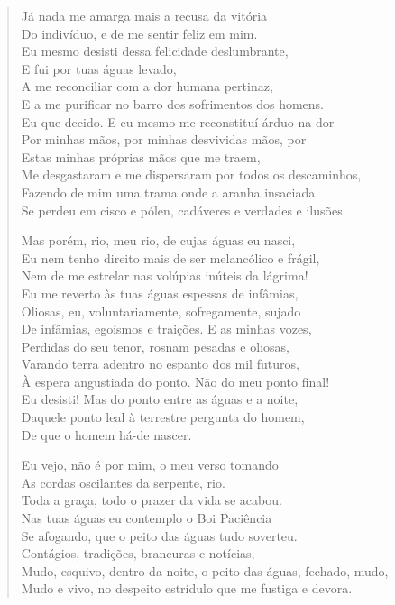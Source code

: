 \begin{verse}
Já nada me amarga mais a recusa da vitória\\
Do indivíduo, e de me sentir feliz em mim.\\
Eu mesmo desisti dessa felicidade deslumbrante,\\
E fui por tuas águas levado,\\
A me reconciliar com a dor humana pertinaz,\\
E a me purificar no barro dos sofrimentos dos homens.\\
Eu que decido. E eu mesmo me reconstituí árduo na dor\\
Por minhas mãos, por minhas desvividas mãos, por\\
Estas minhas próprias mãos que me traem,\\
Me desgastaram e me dispersaram por todos os descaminhos,\\
Fazendo de mim uma trama onde a aranha insaciada\\
Se perdeu em cisco e pólen, cadáveres e verdades e ilusões.

Mas porém, rio, meu rio, de cujas águas eu nasci,\\
Eu nem tenho direito mais de ser melancólico e frágil,\\
Nem de me estrelar nas volúpias inúteis da lágrima!\\
Eu me reverto às tuas águas espessas de infâmias,\\
Oliosas, eu, voluntariamente, sofregamente, sujado\\
De infâmias, egoísmos e traições. E as minhas vozes,\\
Perdidas do seu tenor, rosnam pesadas e oliosas,\\
Varando terra adentro no espanto dos mil futuros,\\
À espera angustiada do ponto. Não do meu ponto final!\\
Eu desisti! Mas do ponto entre as águas e a noite,\\
Daquele ponto leal à terrestre pergunta do homem,\\
De que o homem há-de nascer.

Eu vejo, não é por mim, o meu verso tomando\\
As cordas oscilantes da serpente, rio.\\
Toda a graça, todo o prazer da vida se acabou.\\
Nas tuas águas eu contemplo o Boi Paciência\\
Se afogando, que o peito das águas tudo soverteu.\\
Contágios, tradições, brancuras e notícias,\\
Mudo, esquivo, dentro da noite, o peito das águas, fechado, mudo,\\
Mudo e vivo, no despeito estrídulo que me fustiga e devora.


\end{verse}
